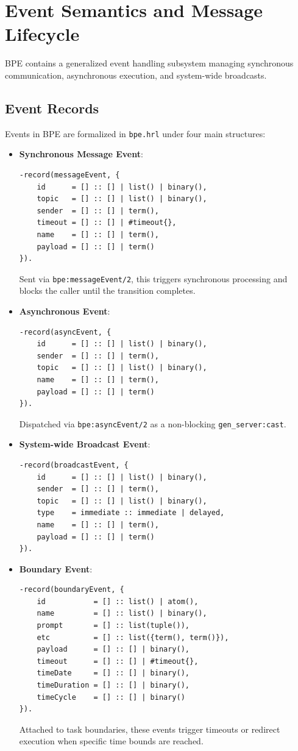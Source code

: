 \documentclass[11pt,a4paper]{article}
\begin{document}
\newpage
\section{Event Semantics and Message Lifecycle}

BPE contains a generalized event handling subsystem managing synchronous communication, asynchronous execution, and system-wide broadcasts.

\subsection{Event Records}

Events in BPE are formalized in \texttt{bpe.hrl} under four main structures:

\begin{itemize}
    \item \textbf{Synchronous Message Event}:
    \begin{lstlisting}
-record(messageEvent, {
    id      = [] :: [] | list() | binary(),
    topic   = [] :: [] | list() | binary(),
    sender  = [] :: [] | term(),
    timeout = [] :: [] | #timeout{},
    name    = [] :: [] | term(),
    payload = [] :: [] | term()
}).
    \end{lstlisting}
    Sent via \texttt{bpe:messageEvent/2}, this triggers synchronous processing and blocks the caller until the transition completes.
    
    \item \textbf{Asynchronous Event}:
    \begin{lstlisting}
-record(asyncEvent, {
    id      = [] :: [] | list() | binary(),
    sender  = [] :: [] | term(),
    topic   = [] :: [] | list() | binary(),
    name    = [] :: [] | term(),
    payload = [] :: [] | term()
}).
    \end{lstlisting}
    Dispatched via \texttt{bpe:asyncEvent/2} as a non-blocking \texttt{gen\_server:cast}.
    
    \item \textbf{System-wide Broadcast Event}:
    \begin{lstlisting}
-record(broadcastEvent, {
    id      = [] :: [] | list() | binary(),
    sender  = [] :: [] | term(),
    topic   = [] :: [] | list() | binary(),
    type    = immediate :: immediate | delayed,
    name    = [] :: [] | term(),
    payload = [] :: [] | term()
}).
    \end{lstlisting}
    
    \item \textbf{Boundary Event}:
    \begin{lstlisting}
-record(boundaryEvent, {
    id           = [] :: list() | atom(),
    name         = [] :: list() | binary(),
    prompt       = [] :: list(tuple()),
    etc          = [] :: list({term(), term()}),
    payload      = [] :: [] | binary(),
    timeout      = [] :: [] | #timeout{},
    timeDate     = [] :: [] | binary(),
    timeDuration = [] :: [] | binary(),
    timeCycle    = [] :: [] | binary()
}).
    \end{lstlisting}
    Attached to task boundaries, these events trigger timeouts or redirect execution when specific time bounds are reached.
\end{itemize}
\end{document}
